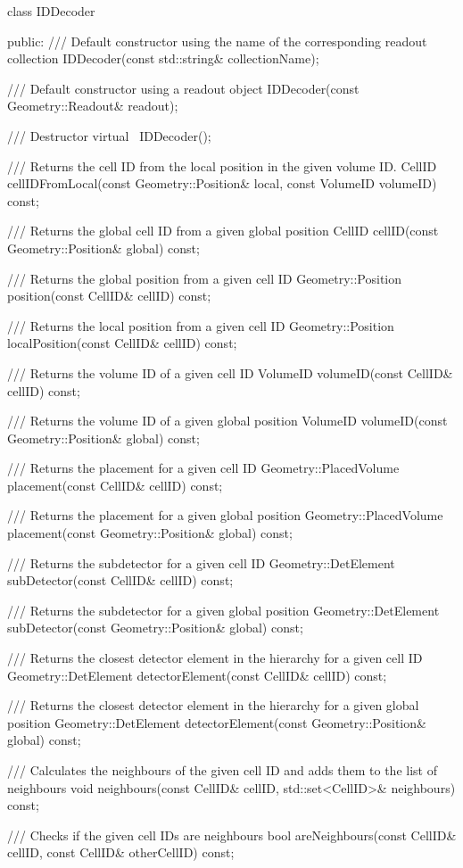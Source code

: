 \documentclass[10pt,a4paper]{article}
\begin{document}
\begin{code}
  class IDDecoder {
  public:
     /// Default constructor using the name of the corresponding readout collection
    IDDecoder(const std::string& collectionName);
    
     /// Default constructor using a readout object
    IDDecoder(const Geometry::Readout& readout);
    
     /// Destructor
    virtual ~IDDecoder();
    
     /// Returns the cell ID from the local position in the given volume ID.
    CellID cellIDFromLocal(const Geometry::Position& local, const VolumeID volumeID) const;
    
     /// Returns the global cell ID from a given global position
    CellID cellID(const Geometry::Position& global) const;
    
     /// Returns the global position from a given cell ID
    Geometry::Position position(const CellID& cellID) const;
    
     /// Returns the local position from a given cell ID
    Geometry::Position localPosition(const CellID& cellID) const;
    
     /// Returns the volume ID of a given cell ID
    VolumeID volumeID(const CellID& cellID) const;
    
     /// Returns the volume ID of a given global position
    VolumeID volumeID(const Geometry::Position& global) const;
    
     /// Returns the placement for a given cell ID
    Geometry::PlacedVolume placement(const CellID& cellID) const;
    
     /// Returns the placement for a given global position
    Geometry::PlacedVolume placement(const Geometry::Position& global) const;
    
     /// Returns the subdetector for a given cell ID
    Geometry::DetElement subDetector(const CellID& cellID) const;
    
     /// Returns the subdetector for a given global position
    Geometry::DetElement subDetector(const Geometry::Position& global) const;
    
     /// Returns the closest detector element in the hierarchy for a given cell ID
    Geometry::DetElement detectorElement(const CellID& cellID) const;
    
     /// Returns the closest detector element in the hierarchy for a given global position
    Geometry::DetElement detectorElement(const Geometry::Position& global) const;
    
     /// Calculates the neighbours of the given cell ID and adds them to the list of neighbours
    void neighbours(const CellID& cellID, std::set<CellID>& neighbours) const;
    
     /// Checks if the given cell IDs are neighbours
    bool areNeighbours(const CellID& cellID, const CellID& otherCellID) const;
}
\end{code}
\end{document}
